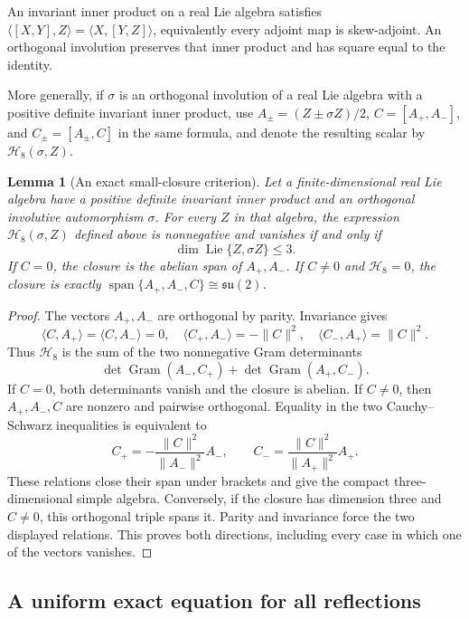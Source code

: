 \documentclass[11pt,a4paper]{article}
\newtheorem{lemma}[lemma]{Lemma}
\newcommand{\Lie}{\operatorname{Lie}}
\newcommand{\Span}{\operatorname{span}}
\begin{document}
An invariant inner product on a real Lie algebra satisfies $\langle[X,Y],Z\rangle=\langle X,[Y,Z]\rangle$, equivalently every adjoint map is skew-adjoint.  An orthogonal involution preserves that inner product and has square equal to the identity.

More generally, if $\sigma$ is an orthogonal involution of a real Lie algebra
with a positive definite invariant inner product, use
$A_\pm=(Z\pm\sigma Z)/2$, $C=[A_+,A_-]$, and $C_\pm=[A_\pm,C]$ in the same
formula, and denote the resulting scalar by $\mathcal H_8(\sigma,Z)$.

\begin{lemma}[An exact small-closure criterion]
\label{lem:H8}
Let a finite-dimensional real Lie algebra have a positive definite invariant inner product and an orthogonal involutive automorphism $\sigma$.  For every $Z$ in that algebra, the expression $\mathcal H_8(\sigma,Z)$ defined above is nonnegative and vanishes if and only if
\[
\dim\Lie\{Z,\sigma Z\}\le3.
\]
If $C=0$, the closure is the abelian span of $A_+,A_-$.  If $C\ne0$ and $\mathcal H_8=0$, the closure is exactly $\Span\{A_+,A_-,C\}\cong\mathfrak{su}(2)$.
\end{lemma}

\begin{proof}
The vectors $A_+,A_-$ are orthogonal by parity.  Invariance gives
\[
\langle C,A_+\rangle=\langle C,A_-\rangle=0,
\quad
\langle C_+,A_-\rangle=-\|C\|^2,
\quad
\langle C_-,A_+\rangle=\|C\|^2.
\]
Thus $\mathcal H_8$ is the sum of the two nonnegative Gram determinants
\[
\det\operatorname{Gram}(A_-,C_+)
+\det\operatorname{Gram}(A_+,C_-).
\]
If $C=0$, both determinants vanish and the closure is abelian.  If $C\ne0$, then $A_+,A_-,C$ are nonzero and pairwise orthogonal.  Equality in the two Cauchy--Schwarz inequalities is equivalent to
\[
C_+=-\frac{\|C\|^2}{\|A_-\|^2}A_-,\qquad
C_-=\frac{\|C\|^2}{\|A_+\|^2}A_+.
\]
These relations close their span under brackets and give the compact three-dimensional simple algebra.  Conversely, if the closure has dimension three and $C\ne0$, this orthogonal triple spans it.  Parity and invariance force the two displayed relations.  This proves both directions, including every case in which one of the vectors vanishes.
\end{proof}

\subsection{A uniform exact equation for all reflections}
\end{document}
